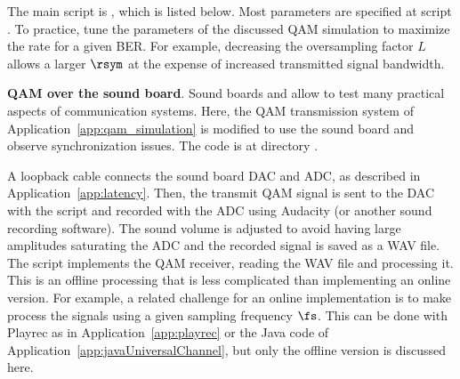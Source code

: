 The main script is , which is listed below. Most parameters are specified at script .
To practice, tune the parameters of the discussed QAM simulation to maximize the rate for a given BER. For example, decreasing the oversampling factor $L$ allows a larger $\rsym$ at the expense of increased transmitted signal bandwidth.
\eApplication

\bApplication
\textbf{QAM over the sound board}.
\label{app:qamSoundBoard}
Sound boards and {\matlab} allow to test many practical aspects of communication systems. Here, the QAM transmission system of Application~\ref{app:qam_simulation} is modified to use the sound board and observe synchronization issues. The code is at directory .

A loopback cable connects the sound board DAC and ADC, as described in Application~\ref{app:latency}. Then, the transmit QAM signal is sent to the DAC with the script  and recorded with the ADC using Audacity (or another sound recording software). The sound volume is adjusted to avoid having large amplitudes saturating the ADC and the recorded signal is saved as a WAV file. The script  implements the QAM receiver, reading the WAV file and processing it. This is an offline processing that is less complicated than implementing an online version. For example, a related challenge for an online implementation is to make {\matlab} process the signals using a given sampling frequency $\fs$. This can be done with Playrec as in Application~\ref{app:playrec} or the Java code of Application~\ref{app:javaUniversalChannel}, but only the offline version is discussed here.

